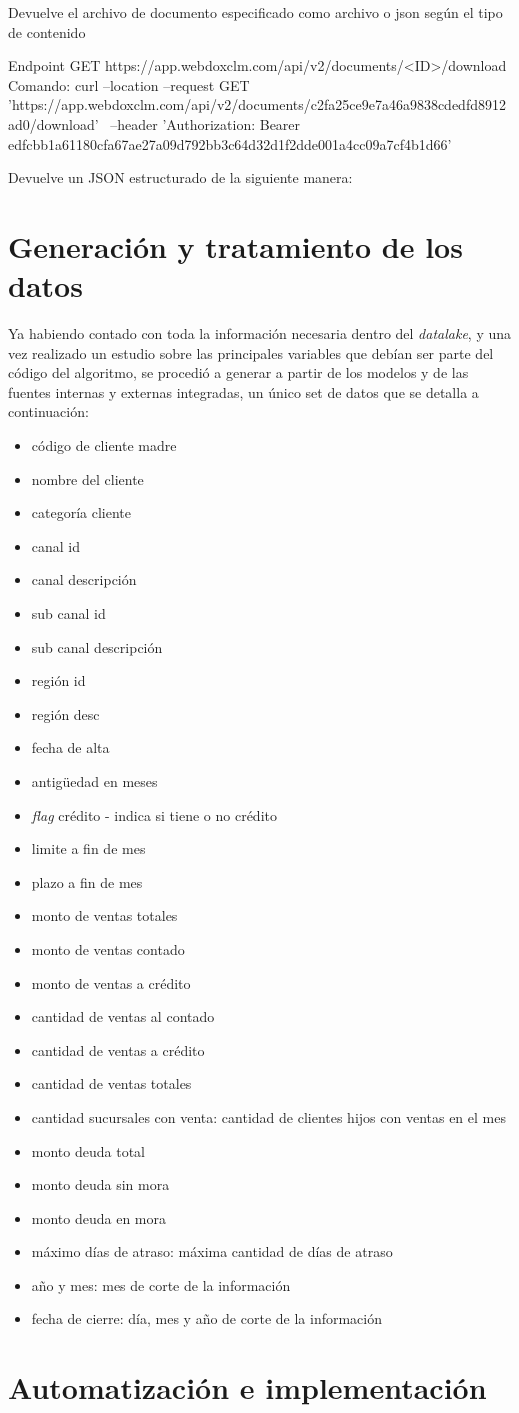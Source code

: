 Devuelve el archivo de documento especificado como archivo o json según el tipo de contenido

Endpoint GET https://app.webdoxclm.com/api/v2/documents/<ID>/download
Comando: curl --location --request GET 'https://app.webdoxclm.com/api/v2/documents/c2fa25ce9e7a46a9838cdedfd8912ad0/download' \
--header 'Authorization: Bearer edfcbb1a61180cfa67ae27a09d792bb3c64d32d1f2dde001a4cc09a7cf4b1d66'

Devuelve un JSON estructurado de la siguiente manera:








\section{Generación y tratamiento de los datos}
Ya habiendo contado con toda la información necesaria dentro del \textit{datalake}, y una vez realizado un estudio sobre las principales variables que debían ser parte del código del algoritmo, se procedió a generar a partir de los modelos y de las fuentes internas y externas integradas, un único set de datos que se detalla a continuación:
\begin{itemize}
\item código de cliente madre 
\item nombre del cliente  
\item categoría cliente 
\item canal id 
\item canal descripción 
\item sub canal id 
\item sub canal descripción 
\item región id 
\item región desc 
\item fecha de alta 
\item antigüedad en meses
\item \textit{flag} crédito - indica si tiene o no crédito 
\item limite a fin de mes 
\item plazo a fin de mes 
\item monto de ventas totales
\item monto de ventas contado
\item monto de ventas a crédito
\item cantidad de ventas al contado 
\item cantidad de ventas a crédito
\item cantidad de ventas totales
\item cantidad sucursales con venta: cantidad de clientes hijos con ventas en el mes
\item monto deuda total
\item monto deuda sin mora 
\item monto deuda en mora
\item máximo días de atraso: máxima cantidad de días de atraso 
\item año y mes: mes de corte de la información
\item fecha de cierre: día, mes y año de corte de la información 
\end{itemize}



\section{Automatización e implementación}



